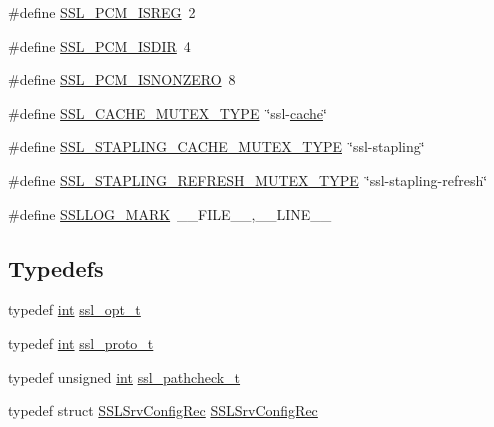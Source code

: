 \begin{DoxyCompactItemize}
\item 
\#define \hyperlink{group__MOD__SSL__PRIVATE_gaf6c6ed18cc0c9536ac6388a028088ad4}{S\+S\+L\+\_\+\+P\+C\+M\+\_\+\+I\+S\+R\+EG}~2
\item 
\#define \hyperlink{group__MOD__SSL__PRIVATE_ga56b63865a7b14ea38ba500e7cbd00b4d}{S\+S\+L\+\_\+\+P\+C\+M\+\_\+\+I\+S\+D\+IR}~4
\item 
\#define \hyperlink{group__MOD__SSL__PRIVATE_ga210d029c8b5399e32a8a78f7243f5e21}{S\+S\+L\+\_\+\+P\+C\+M\+\_\+\+I\+S\+N\+O\+N\+Z\+E\+RO}~8
\item 
\#define \hyperlink{group__MOD__SSL__PRIVATE_gab48024230985a60917a6ca99692a9f25}{S\+S\+L\+\_\+\+C\+A\+C\+H\+E\+\_\+\+M\+U\+T\+E\+X\+\_\+\+T\+Y\+PE}~\char`\"{}ssl-\/\hyperlink{structcache}{cache}\char`\"{}
\item 
\#define \hyperlink{group__MOD__SSL__PRIVATE_gadd750e47a962f5582729941a3f1bf842}{S\+S\+L\+\_\+\+S\+T\+A\+P\+L\+I\+N\+G\+\_\+\+C\+A\+C\+H\+E\+\_\+\+M\+U\+T\+E\+X\+\_\+\+T\+Y\+PE}~\char`\"{}ssl-\/stapling\char`\"{}
\item 
\#define \hyperlink{group__MOD__SSL__PRIVATE_ga83ee4b5ea14021a9e7d9961ebb148b20}{S\+S\+L\+\_\+\+S\+T\+A\+P\+L\+I\+N\+G\+\_\+\+R\+E\+F\+R\+E\+S\+H\+\_\+\+M\+U\+T\+E\+X\+\_\+\+T\+Y\+PE}~\char`\"{}ssl-\/stapling-\/refresh\char`\"{}
\item 
\#define \hyperlink{group__MOD__SSL__PRIVATE_ga0e50481cba5952ce59ad2c103f8128a4}{S\+S\+L\+L\+O\+G\+\_\+\+M\+A\+RK}~\+\_\+\+\_\+\+F\+I\+L\+E\+\_\+\+\_\+,\+\_\+\+\_\+\+L\+I\+N\+E\+\_\+\+\_\+
\end{DoxyCompactItemize}
\subsection*{Typedefs}
\begin{DoxyCompactItemize}
\item 
typedef \hyperlink{pcre_8txt_a42dfa4ff673c82d8efe7144098fbc198}{int} \hyperlink{group__MOD__SSL__PRIVATE_ga8f8f6b4f4f8d30522eb1f6768070dd8a}{ssl\+\_\+opt\+\_\+t}
\item 
typedef \hyperlink{pcre_8txt_a42dfa4ff673c82d8efe7144098fbc198}{int} \hyperlink{group__MOD__SSL__PRIVATE_ga5139e7dd6af8f34cd9cf51b9c35312f1}{ssl\+\_\+proto\+\_\+t}
\item 
typedef unsigned \hyperlink{pcre_8txt_a42dfa4ff673c82d8efe7144098fbc198}{int} \hyperlink{group__MOD__SSL__PRIVATE_ga9c80719ccb88e941c1473a4456d662ed}{ssl\+\_\+pathcheck\+\_\+t}
\item 
typedef struct \hyperlink{structSSLSrvConfigRec}{S\+S\+L\+Srv\+Config\+Rec} \hyperlink{group__MOD__SSL__PRIVATE_ga86434044a97d59875151caecf8b69c55}{S\+S\+L\+Srv\+Config\+Rec}
\end{DoxyCompactItemize}
